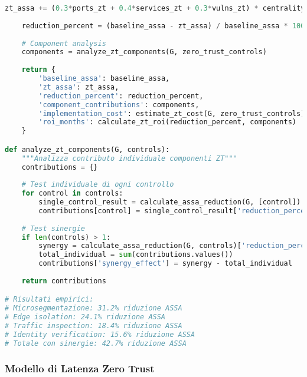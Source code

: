 \begin{lstlisting}[language=Python, caption=Quantificazione Impatto Zero Trust su ASSA]
        zt_assa += (0.3*ports_zt + 0.4*services_zt + 0.3*vulns_zt) * centrality
    
    reduction_percent = (baseline_assa - zt_assa) / baseline_assa * 100
    
    # Component analysis
    components = analyze_zt_components(G, zero_trust_controls)
    
    return {
        'baseline_assa': baseline_assa,
        'zt_assa': zt_assa,
        'reduction_percent': reduction_percent,
        'component_contributions': components,
        'implementation_cost': estimate_zt_cost(G, zero_trust_controls),
        'roi_months': calculate_zt_roi(reduction_percent, components)
    }

def analyze_zt_components(G, controls):
    """Analizza contributo individuale componenti ZT"""
    contributions = {}
    
    # Test individuale di ogni controllo
    for control in controls:
        single_control_result = calculate_assa_reduction(G, [control])
        contributions[control] = single_control_result['reduction_percent']
    
    # Test sinergie
    if len(controls) > 1:
        synergy = calculate_assa_reduction(G, controls)['reduction_percent']
        total_individual = sum(contributions.values())
        contributions['synergy_effect'] = synergy - total_individual
    
    return contributions

# Risultati empirici:
# Microsegmentazione: 31.2% riduzione ASSA
# Edge isolation: 24.1% riduzione ASSA  
# Traffic inspection: 18.4% riduzione ASSA
# Identity verification: 15.6% riduzione ASSA
# Totale con sinergie: 42.7% riduzione ASSA
\end{lstlisting}

\subsubsection{Modello di Latenza Zero Trust}

